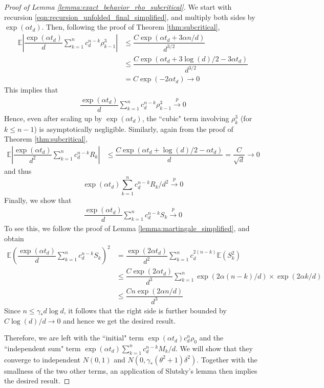 \documentclass[10pt,a4paper]{amsart}
\newcommand{\E}{\mathbb{E}}
\begin{document}
\begin{proof}[Proof of Lemma \ref{lemma:exact_behavior_rho_subcritical}]
    We start with recursion \ref{eqn:recursion_unfolded_final_simplified}, and multiply both sides by $\exp(\alpha t_d)$. Then, following the proof of Theorem \ref{thm:subcritical},
    \begin{align*}
        \E\left|\dfrac{\exp(\alpha t_d)}{d}\sum_{k=1}^n c_d^{n-k}\rho^3_{k-1}\right|&\leq \dfrac{C\exp(\alpha t_d+3\alpha n/d)}{d^{3/2}}\\
        &\leq \dfrac{C\exp(\alpha t_d + 3\log(d)/2-3\alpha t_d)}{d^{3/2}}\\
        &=C\exp(-2\alpha t_d)\to 0
    \end{align*}This implies that 
    \begin{align*}
        \dfrac{\exp(\alpha t_d)}{d}\sum_{k=1}^n c_d^{n-k}\rho^3_{k-1}\stackrel{p}{\to}0
    \end{align*}
    Hence, even after scaling up by $\exp(\alpha t_d)$, the ``cubic" term involving $\rho_k^3$ (for $k\leq n-1$) is asymptotically negligible. Similarly, again from the proof of Theorem \ref{thm:subcritical},
    \begin{align*}
        \E\left|\dfrac{\exp(\alpha t_d)}{d^2}\sum_{k=1}^n c_d^{n-k}R_k\right| &\leq \dfrac{C\exp(\alpha t_d+\log(d)/2-\alpha t_d)}{d}= \dfrac{C}{\sqrt{d}}\to 0
    \end{align*}and thus $$\exp(\alpha t_d)\sum_{k=1}^n c_d^{n-k}R_k/d^2\stackrel{p}{\to}0$$
    Finally, we show that
    \begin{align*}
        \dfrac{\exp(\alpha t_d)}{d}\sum_{k=1}^n c_d^{n-k}S_k\stackrel{p}{\to}0
    \end{align*}To see this, we follow the proof of Lemma \ref{lemma:martingale_simplified}, and obtain
    \begin{align*}
        \E\left(\dfrac{\exp(\alpha t_d)}{d}\sum_{k=1}^n c_d^{n-k}S_k\right)^2 &= \dfrac{\exp(2\alpha t_d)}{d^2}\sum_{k=1}^n c_d^{2(n-k)}\E(S_k^2)\\
        &\leq \dfrac{C\exp(2\alpha t_d)}{d^3}\sum_{k=1}^n \exp(2\alpha(n-k)/d)\times \exp(2\alpha k/d)\\
        &\leq \dfrac{Cn\exp(2\alpha n/d)}{d^3}
    \end{align*}Since $n\leq \gamma_*d\log d$, it follows that the right side is further bounded by $C\log(d)/d\to 0$ and hence we get the desired result.

    Therefore, we are left with the ``initial" term $\exp(\alpha t_d)c_d^n\rho_0$ and the ``independent sum" term $\exp(\alpha t_d)\sum_{k=1}^n c_d^{n-k}M_k/d$. We will show that they converge to independent $N(0,1)$ and $N(0, \gamma_*(\theta^2+1)\delta^2)$. Together with the smallness of the two other terms, an application of Slutsky's lemma then implies the desired result.


\end{proof}
\end{document}
